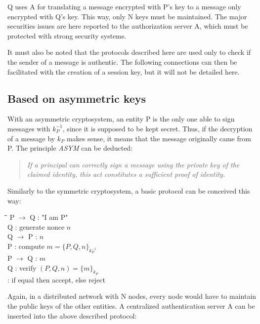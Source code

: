 Q uses A for translating a message encrypted with P's key to a message only encrypted with Q's key. This way, only N keys must be maintained. The major securities issues are here reported to the authorization server A, which must be protected with strong security systems.

It must also be noted that the protocols described here are used only to check if the sender of a message is authentic. The following connections can then be facilitated with the creation of a session key, but it will not be detailed here.

\subsection{Based on asymmetric keys}
With an asymmetric cryptosystem, an entity P is the only one able to sign messages with $k_{P}^{-1}$, since it is supposed to be kept secret. Thus, if the decryption of a message by $k_{P}$ makes sense, it means that the message originally came from P. The principle \emph{ASYM} can be deducted\cite{Woo1997}:

\begin{quote}
	\textit{If a principal can correctly sign a message using the private key of the claimed identity, this act constitutes a sufficient proof of identity.}
\end{quote}

Similarly to the symmetric cryptosystem, a basic protocol can be conceived this way:

\begin{tabbing}
	\hspace{4em}\=\hspace{4em}\=\hspace{2em}\=\kill
	\>  P $\rightarrow$ Q\>  : \> "I am P" \\
	\>  Q  \>  : \> generate nonce $n$	\\
	\>  Q $\rightarrow$ P \>  : \> $n$ \\
	\>  P  \>  : \> compute $m = \lbrace P, Q, n \rbrace_{k_{P}^{-1}}$ 				\\
	\>  P $\rightarrow$ Q \>  : \> $m$ \\
	\>  Q \>  : \> verify $(P,Q,n) = \lbrace m \rbrace_{k_{P}}$ \\
	\>    \>  : \> if equal then accept, else reject \\
\end{tabbing} 

Again, in a distributed network with N nodes, every node would have to maintain the public keys of the other entities. A centralized authentication server A can be inserted into the above described protocol:

